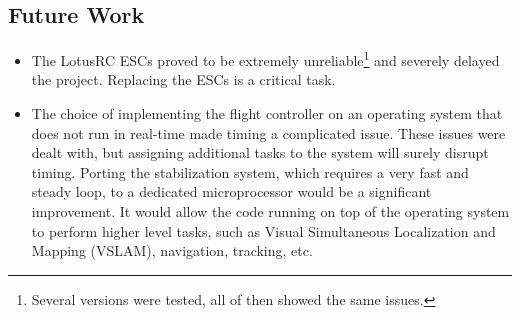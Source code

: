 \documentclass[conference]{IEEEtran}
\begin{document}
\subsection{Future Work}
\begin{itemize}
\item The LotusRC ESCs proved to be extremely unreliable\footnote{Several versions were tested, all of then showed the same issues.} and severely delayed the project. Replacing the ESCs is a critical task.
\item The choice of implementing the flight controller on an operating system that does not run in real-time made timing a complicated issue. These issues were dealt with, but assigning additional tasks to the system will surely disrupt timing. Porting the stabilization system, which requires a very fast and steady loop, to a dedicated microprocessor would be a significant improvement. It would allow the code running on top of the operating system to perform higher level tasks, such as Visual Simultaneous Localization and Mapping (VSLAM), navigation, tracking, etc.
\end{itemize}







%
%
%
 



\end{document}
